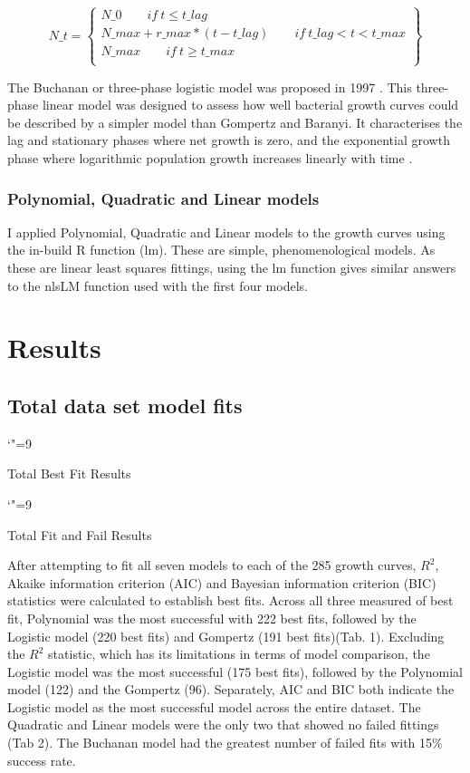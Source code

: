 \documentclass[titlepage]{article}
\begin{document}
\[
  N\_t = \left\{\begin{array}{l}
    N\_0 \qquad     if \ t \le t\_lag\\
    N\_max + r\_max * (t - t\_lag) \qquad if \ t\_lag < t < t\_max\\
    N\_max \qquad if \ t \ge t\_max\\
  \end{array}\right\}
\]

The Buchanan or three-phase logistic model was proposed in 1997 \cite{buchanan1997simple}. This three-phase linear model was designed to assess how well bacterial growth curves could be described by a simpler model than Gompertz and Baranyi. It characterises the lag and stationary phases where net growth is zero, and the exponential growth phase where logarithmic population growth increases linearly with time \cite{buchanan1997simple}.

\subsubsection{Polynomial, Quadratic and Linear models}
I applied Polynomial, Quadratic and Linear models to the growth curves using the in-build R function (lm). These are simple, phenomenological models. As these are linear least squares fittings, using the lm function gives similar answers to the nlsLM function used with the first four models. 

\section{Results}
\subsection{Total data set model fits}
\begin{table}[!htbp]
\catcode`"=9
\centering
\caption{Total Best Fit Results}
\end{table}

\begin{table}[!htbp]
\catcode`"=9
\centering
\caption{Total Fit and Fail Results}
\end{table}


After attempting to fit all seven models to each of the 285 growth curves, $R^2$, Akaike information criterion (AIC) and Bayesian information criterion (BIC) statistics were calculated to establish best fits. Across all three measured of best fit, Polynomial was the most successful with 222 best fits, followed by the Logistic model (220 best fits) and Gompertz (191 best fits)(Tab. 1). Excluding the $R^2$ statistic, which has its limitations in terms of model comparison, the Logistic model was the most successful (175 best fits), followed by the Polynomial model (122) and the Gompertz (96). Separately, AIC and BIC both indicate the Logistic model as the most successful model across the entire dataset. 
  The Quadratic and Linear models were the only two that showed no failed fittings (Tab 2). The Buchanan model had the greatest number of failed fits with 15\% success rate.
\end{document}
